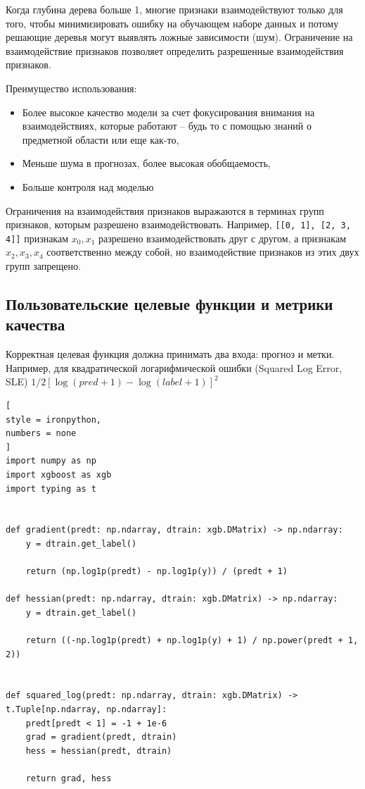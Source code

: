 \documentclass[%
	11pt,
	a4paper,
	utf8,
		]{article}
\begin{document}
Когда глубина дерева больше 1, многие признаки взаимодействуют только для того, чтобы минимизировать ошибку на обучающем наборе данных и потому решающие деревья могут выявлять ложные зависимости (шум). Ограничение на взаимодействие признаков позволяет определить разрешенные взаимодействия признаков.

Преимущество использования:
\begin{itemize}
	\item Более высокое качество модели за счет фокусирования внимания на взаимодействиях, которые работают -- будь то с помощью знаний о предметной области или еще как-то,
	
	\item Меньше шума в прогнозах, более высокая обобщаемость,
	
	\item Больше контроля над моделью
\end{itemize}

Ограничения на взаимодействия признаков выражаются в терминах групп признаков, которым разрешено взаимодействовать. Например, \verb|[[0, 1], [2, 3, 4]]| признакам $ x_0, x_1 $ разрешено взаимодействовать друг с другом, а признакам $ x_2, x_3, x_4 $ соответственно между собой, но взаимодействие признаков из этих двух групп запрещено.


\subsection{Пользовательские целевые функции и метрики качества}

Корректная целевая функция должна принимать два входа: прогноз и метки. Например, для квадратической логарифмической ошибки (Squared Log Error, SLE) $ 1 / 2 [\log (pred + 1) - \log(label +1)]^2 $
\begin{lstlisting}[
style = ironpython,
numbers = none
]
import numpy as np
import xgboost as xgb
import typing as t


def gradient(predt: np.ndarray, dtrain: xgb.DMatrix) -> np.ndarray:
	y = dtrain.get_label()

	return (np.log1p(predt) - np.log1p(y)) / (predt + 1)

def hessian(predt: np.ndarray, dtrain: xgb.DMatrix) -> np.ndarray:
	y = dtrain.get_label()

	return ((-np.log1p(predt) + np.log1p(y) + 1) / np.power(predt + 1, 2))


def squared_log(predt: np.ndarray, dtrain: xgb.DMatrix) -> t.Tuple[np.ndarray, np.ndarray]:
	predt[predt < 1] = -1 + 1e-6
	grad = gradient(predt, dtrain)
	hess = hessian(predt, dtrain)
	
	return grad, hess
\end{lstlisting}
\end{document}
